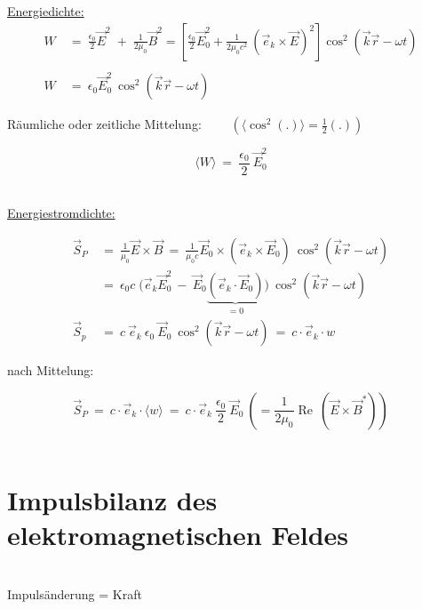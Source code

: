\underline{Energiedichte:}\\

\begin{align*}
W \ &= \ \frac{\epsilon_0}{2} \vec{E}^2 \; + \; \frac{1}{2\mu_0}\vec{B}^2 = \left[\frac{\epsilon_0}{2}\vec{E}_0^2 + \frac{1}{2\mu_0 c^2} \ \left(\vec{e}_k\times\vec{E}\right)^2\right] \cos^2\left(\vec{k}\vec{r}-\omega t\right)\\
\ \\
W \ &= \ \epsilon_0 \vec{E}_0^2 \ \cos^2\left(\vec{k}\vec{r}-\omega t\right)
\end{align*}

Räumliche oder zeitliche Mittelung: $\qquad\left(\langle\cos^2(.)\rangle = \frac{1}{2}(.)\right)$

\begin{equation*}
\langle W\rangle \ = \ \frac{\epsilon_0}{2} \ \vec{E}_0^2
\end{equation*}

\ \\
\underline{Energiestromdichte:}

\begin{align*}
\vec{S}_P \ &= \ \frac{1}{\mu_0} \vec{E}\times\vec{B} \ = \ \frac{1}{\mu_0 c} \vec{E}_0 \times \left(\vec{e}_k\times\vec{E}_0\right) \ \cos^2\left(\vec{k}\vec{r}-\omega t\right)\\
&= \ \epsilon_0 c \; \Bigg(\vec{e}_k\vec{E}_0^2 \ - \ \vec{E}_0\underbrace{\left(\vec{e}_k\cdot\vec{E}_0\right)}_{=0}\Bigg) \ \cos^2\left(\vec{k}\vec{r}-\omega t\right)\\
\vec{S}_p \ &= \ c \ \vec{e}_k \ \epsilon_0 \ \vec{E}_0 \ \cos^2 \left(\vec{k}\vec{r}-\omega t\right) \ = \ c \cdot  \vec{e}_k \cdot w
\end{align*}

nach Mittelung:

\begin{equation*}
\vec{S}_P \ = \ c \cdot \vec{e}_k \cdot \langle w\rangle \ = \ c \cdot \vec{e}_k \ \frac{\epsilon_0}{2} \ \vec{E}_0 \ \left( = \frac{1}{2\mu_0} \operatorname{Re} \ (\vec{E}\times\vec{B}^*)\right)
\end{equation*}
\ \\

\section{Impulsbilanz des elektromagnetischen Feldes}
\ \\
Impulsänderung = Kraft

